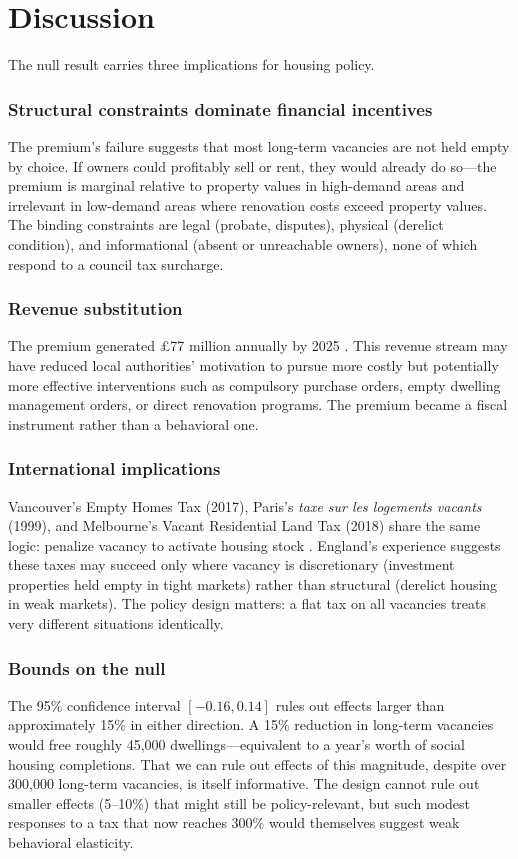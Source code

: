 \documentclass[12pt]{article}
\begin{document}
\section{Discussion}
\label{sec:discussion}

The null result carries three implications for housing policy.

\subsubsection*{Structural constraints dominate financial incentives} The premium's failure suggests that most long-term vacancies are not held empty by choice. If owners could profitably sell or rent, they would already do so---the premium is marginal relative to property values in high-demand areas and irrelevant in low-demand areas where renovation costs exceed property values. The binding constraints are legal (probate, disputes), physical (derelict condition), and informational (absent or unreachable owners), none of which respond to a council tax surcharge.

\subsubsection*{Revenue substitution} The premium generated \pounds 77 million annually by 2025 \citep{mhclg2025ctb}. This revenue stream may have reduced local authorities' motivation to pursue more costly but potentially more effective interventions such as compulsory purchase orders, empty dwelling management orders, or direct renovation programs. The premium became a fiscal instrument rather than a behavioral one.

\subsubsection*{International implications} Vancouver's Empty Homes Tax (2017), Paris's \emph{taxe sur les logements vacants} (1999), and Melbourne's Vacant Residential Land Tax (2018) share the same logic: penalize vacancy to activate housing stock \citep{crook2019tax, oecd2021brick}. England's experience suggests these taxes may succeed only where vacancy is discretionary (investment properties held empty in tight markets) rather than structural (derelict housing in weak markets). The policy design matters: a flat tax on all vacancies treats very different situations identically.

\subsubsection*{Bounds on the null} The 95\% confidence interval $[-0.16, 0.14]$ rules out effects larger than approximately 15\% in either direction. A 15\% reduction in long-term vacancies would free roughly 45,000 dwellings---equivalent to a year's worth of social housing completions. That we can rule out effects of this magnitude, despite over 300,000 long-term vacancies, is itself informative. The design cannot rule out smaller effects (5--10\%) that might still be policy-relevant, but such modest responses to a tax that now reaches 300\% would themselves suggest weak behavioral elasticity.
\end{document}
